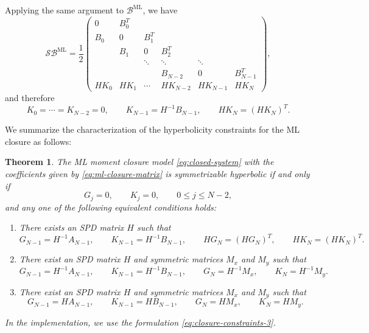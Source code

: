 \documentclass[11pt]{article}
\numberwithin{equation}{section}
\newtheorem{thm}{Theorem}[section]
\newcommand{\half}{\frac{1}{2}}
\begin{document}
Applying the same argument to $\mathcal{B}^{\textrm{ML}}$, we have
\begin{equation}
\mathcal{S}\mathcal{B}^{\textrm{ML}}
=
\half
\begin{pmatrix}
0 & B_0^T \\
B_0 & 0 & B_1^T \\
& B_1 & 0 & B_2^T \\
& & \ddots & \ddots & \ddots \\
& & & B_{N-2} & 0 & B_{N-1}^T \\
H K_0 & H K_1 & \cdots & H K_{N-2} & H K_{N-1} & H K_N
\end{pmatrix},
\end{equation}
and therefore
\begin{equation}
K_0=\cdots=K_{N-2}=0,
\qquad
K_{N-1}=H^{-1}B_{N-1},
\qquad
H K_N=(H K_N)^T.
\end{equation}

We summarize the characterization of the hyperbolicity constraints for the ML closure as follows:
\begin{thm}
    The ML moment closure model \eqref{eq:closed-system} with the coefficients
    given by \eqref{eq:ml-closure-matrix} is symmetrizable hyperbolic if and
    only if 
    \begin{equation}            
        G_j=0,\qquad K_j=0,\qquad 0\le j\le N-2,
    \end{equation}
    and any one of the following equivalent conditions holds:
    \begin{enumerate}
        \item There exists an SPD matrix $H$ such that
        \begin{equation}\label{eq:closure-constraints-1}
            G_{N-1}=H^{-1}A_{N-1},
            \qquad
            K_{N-1}=H^{-1}B_{N-1},
            \qquad
            HG_N=(HG_N)^T,
            \qquad
            HK_N=(HK_N)^T.
        \end{equation}

        \item There exist an SPD matrix $H$ and symmetric matrices $M_x$ and
        $M_y$ such that
        \begin{equation}\label{eq:closure-constraints-2}
            G_{N-1}=H^{-1}A_{N-1},
            \qquad
            K_{N-1}=H^{-1}B_{N-1},
            \qquad
            G_N = H^{-1}M_x,
            \qquad
            K_N = H^{-1}M_y.
        \end{equation}

        \item There exist an SPD matrix $H$ and symmetric matrices $M_x$ and
        $M_y$ such that
        \begin{equation}\label{eq:closure-constraints-3}
            G_{N-1}=H A_{N-1},
            \qquad
            K_{N-1}=H B_{N-1},
            \qquad
            G_N = H M_x,
            \qquad
            K_N = H M_y.
        \end{equation}
    \end{enumerate}
    In the implementation, we use the formulation
    \eqref{eq:closure-constraints-3}.
\end{thm}
\end{document}
